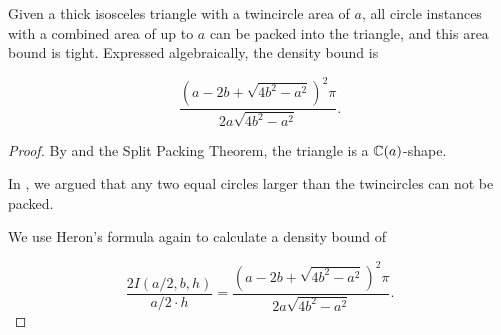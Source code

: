 \documentclass[a4paper,style=print,oneside,bibliography=totoc,nexus,lnum,extramargin]{tubsbook}
\begin{document}
\begin{theorem}\label{th:iso}
    Given a thick isosceles triangle with a twincircle area of $a$, all circle instances with a combined area of up to $a$ can be packed into the triangle, and this area bound is tight. Expressed algebraically, the density bound is

    $$\frac{(a-2b+\sqrt{4b^2-a^2})^2\pi}{2a\sqrt{4b^2-a^2}}.$$
\end{theorem}

\begin{proof}
    By  and the Split Packing Theorem, the triangle is a $\mathbb{C}(a)$-shape.

    In , we argued that any two equal circles larger than the twincircles can not be packed.

    We use Heron's formula again to calculate a density bound of

    $$\frac{2I(a/2, b, h)}{a/2\cdot h} = \frac{(a-2b+\sqrt{4b^2-a^2})^2\pi}{2a\sqrt{4b^2-a^2}}.$$
\end{proof}

%
%
%
%
%
%
%
\end{document}
